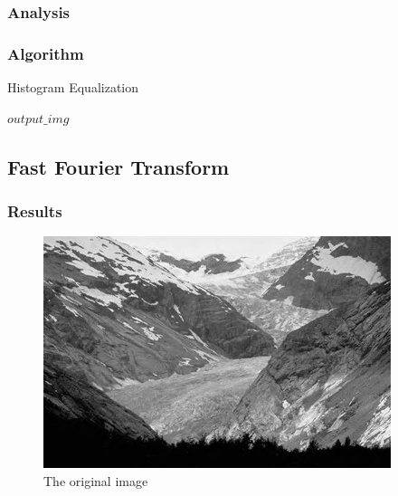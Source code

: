 \documentclass{article}
\begin{document}
\subsubsection{Analysis}

\paragraph{}


\subsubsection{Algorithm}

\begin{algorithm}[H]
\centering
\caption{Histogram Equalization}
  \begin{algorithmic}[1]
      \State \Return $output\_img$
    \EndFunction
  \end{algorithmic}
\end{algorithm}


\subsection{Fast Fourier Transform}

\subsubsection{Results}
\begin{figure}[H]
	\centering
	\includegraphics[width=288pt]{../img/02.png}
	\caption{The original image}
\end{figure}
\end{document}
